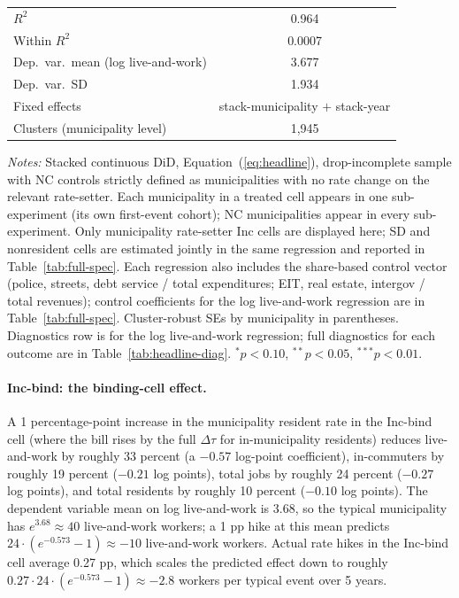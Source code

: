 \documentclass[12pt]{article}
\begin{document}
\begin{table}[H]
\begin{tabular}{lccc}
        $R^2$                                & \multicolumn{3}{c}{0.964} \\
        Within $R^2$                          & \multicolumn{3}{c}{0.0007} \\
        Dep.\ var.\ mean (log live-and-work)& \multicolumn{3}{c}{3.677} \\
        Dep.\ var.\ SD                        & \multicolumn{3}{c}{1.934} \\
        Fixed effects                         & \multicolumn{3}{c}{stack-municipality $+$ stack-year} \\
        Clusters (municipality level)                 & \multicolumn{3}{c}{1{,}945} \\
        \bottomrule
    \end{tabular}
    \vspace{0.3em}
    \begin{minipage}{0.95\textwidth}
        \footnotesize \textit{Notes:} Stacked continuous DiD,
        Equation~(\ref{eq:headline}), drop-incomplete sample with NC
        controls strictly defined as municipalities with no rate change on the
        relevant rate-setter. Each municipality in a treated cell appears in one
        sub-experiment (its own first-event cohort); NC municipalities appear
        in every sub-experiment. Only municipality rate-setter Inc cells are displayed
        here; SD and nonresident cells are estimated jointly in
        the same regression and reported in Table~\ref{tab:full-spec}.
        Each regression also includes the share-based
        control vector (police, streets, debt service / total expenditures;
        EIT, real estate, intergov / total revenues); control coefficients
        for the log live-and-work regression are in
        Table~\ref{tab:full-spec}. Cluster-robust SEs by municipality in parentheses.
        Diagnostics row is for the log live-and-work regression; full
        diagnostics for each outcome are in Table~\ref{tab:headline-diag}.
        $^{*}p<0.10$, $^{**}p<0.05$, $^{***}p<0.01$.
    \end{minipage}
\end{table}

\paragraph{Inc-bind: the binding-cell effect.}
A 1 percentage-point increase in the municipality resident rate in the Inc-bind
cell (where the bill rises by the full $\Delta\tau$ for in-municipality residents)
reduces live-and-work by roughly 33 percent (a $-0.57$
log-point coefficient), in-commuters by roughly 19 percent
($-0.21$ log points), total jobs by roughly 24 percent
($-0.27$ log points), and total residents by roughly 10
percent ($-0.10$ log points). The dependent variable mean
on log live-and-work is 3.68, so the typical municipality has
$e^{3.68} \approx 40$ live-and-work workers; a 1 pp hike at this mean
predicts $24 \cdot (e^{-0.573} - 1) \approx -10$ live-and-work workers.
Actual rate hikes in the Inc-bind cell average 0.27 pp, which scales
the predicted effect down to roughly $0.27 \cdot 24 \cdot (e^{-0.573} - 1)
\approx -2.8$ workers per typical event over 5 years.
\end{document}
